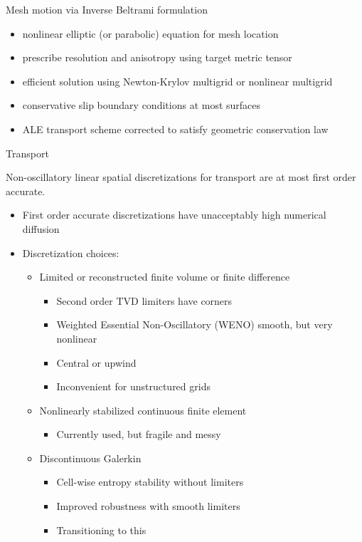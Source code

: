 \documentclass{beamer}
\begin{document}
\begin{frame}{Mesh motion via Inverse Beltrami formulation}
  \begin{itemize}
  \item nonlinear elliptic (or parabolic) equation for mesh location
  \item prescribe resolution and anisotropy using target metric tensor
  \item efficient solution using Newton-Krylov multigrid or nonlinear multigrid
  \item conservative slip boundary conditions at most surfaces
  \item ALE transport scheme corrected to satisfy geometric conservation law
  \end{itemize}
\end{frame}

\begin{frame}{Transport}
  \begin{theorem}[Godunov 1954]
    Non-oscillatory linear spatial discretizations for transport are at most first order accurate.
  \end{theorem}

  \begin{itemize}
  \item First order accurate discretizations have unacceptably high numerical diffusion
  \item Discretization choices:
    \begin{itemize}
    \item Limited or reconstructed finite volume or finite difference
      \begin{itemize}
      \item Second order TVD limiters have corners
      \item Weighted Essential Non-Oscillatory (WENO) smooth, but very nonlinear
      \item Central or upwind
      \item Inconvenient for unstructured grids
      \end{itemize}
    \item Nonlinearly stabilized continuous finite element
      \begin{itemize}
      \item Currently used, but fragile and messy
      \end{itemize}
    \item Discontinuous Galerkin
      \begin{itemize}
      \item Cell-wise entropy stability without limiters
      \item Improved robustness with smooth limiters
      \item Transitioning to this
      \end{itemize}
    \end{itemize}
  \end{itemize}
\end{frame}
\end{document}
